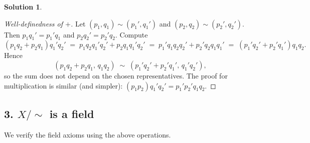 \documentclass[12pt]{article}
\theoremstyle{definition} %
\newtheorem{solution}{Solution}
\theoremstyle{plain} %
\begin{document}
\begin{solution}
    \begin{proof}[Well-definedness of $+$]
      Let $(p_{1},q_{1})\sim(p_{1}',q_{1}')$ and
      $(p_{2},q_{2})\sim(p_{2}',q_{2}')$.  Then
      $p_{1}q_{1}'=p_{1}'q_{1}$ and $p_{2}q_{2}'=p_{2}'q_{2}$.
      Compute
      \[
        (p_{1}q_{2}+p_{2}q_{1})q_{1}'q_{2}'
        \;=\;
        p_{1}q_{2}q_{1}'q_{2}' + p_{2}q_{1}q_{1}'q_{2}'
        \;=\;
        p_{1}'q_{1}q_{2}q_{2}' + p_{2}'q_{2}q_{1}q_{1}'
        \;=\;
        (p_{1}'q_{2}'+p_{2}'q_{1}')q_{1}q_{2}.
      \]
      Hence
      \[
          (p_{1}q_{2}+p_{2}q_{1},\,q_{1}q_{2})
          \;\sim\;
          (p_{1}'q_{2}'+p_{2}'q_{1}',\,q_{1}'q_{2}'),
      \]
      so the sum does not depend on the chosen representatives.  
      The proof for multiplication is similar (and simpler):
      $(p_{1}p_{2})q_{1}'q_{2}' = p_{1}'p_{2}'q_{1}q_{2}$.
    \end{proof}
    
    \subsection*{3.  $X/\!\sim$ is a field}
    
    We verify the field axioms using the above operations.
    

\end{solution}
\end{document}
